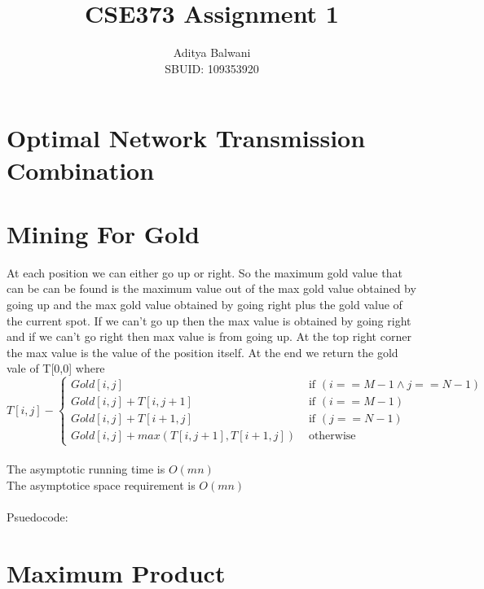 \documentclass{article}
\title{\textbf{CSE373 Assignment 1}}
\author{Aditya Balwani\\SBUID: 109353920}
\begin{document}
\maketitle
\section{Optimal Network Transmission Combination}
\label{sec:Optimal Network Transmission Combination}

\section{Mining For Gold}
\label{sec:Mining For Gold}
    At each position we can either go up or right. So the maximum gold value that can be can be found is the maximum value out of the max gold value obtained by going up and the max gold value obtained by going right plus the gold value of the current spot. If we can't go up then the max value is obtained by going right and if we can't go right then max value is from going up. At the top right corner the max value is the value of the position itself. At the end we return the gold vale of T[0,0] where \\
    \[
    T[i,j]-
    \begin{cases}
        Gold[i,j]&\text{ if }(i==M-1 \land j==N-1)\\
        Gold[i,j]+T[i,j+1]&\text{ if }(i==M-1)\\
        Gold[i,j]+T[i+1,j]&\text{ if }(j==N-1)\\
        Gold[i,j]+max(T[i,j+1], T[i+1,j])&\text{ otherwise}
    \end{cases}
    \]\\
    The asymptotic running time is $O(mn)$\\
    The asymptotice space requirement is $O(mn)$\\\\Psuedocode:

\section{Maximum Product}
\label{sec:Maximum Product}
\end{document}

